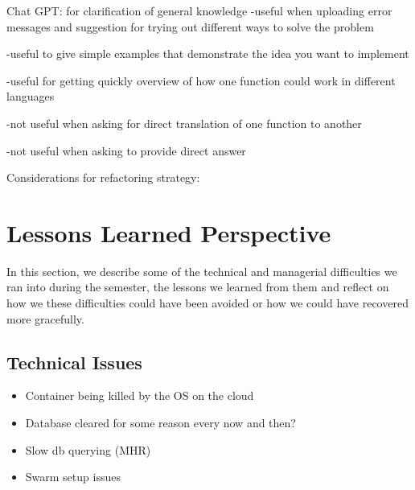 \documentclass{article}
\begin{document}
Chat GPT: for clarification of general knowledge
-useful when uploading error messages and suggestion for trying out different ways to solve the problem

 -useful to give simple examples that demonstrate the idea you want to implement

 -useful for getting quickly overview of how one function could work in different languages

 -not useful when asking for direct translation of one function to another

 -not useful when asking to provide direct answer

 Considerations for refactoring strategy:


\section{Lessons Learned Perspective}
In this section, we describe some of the technical and managerial difficulties we ran into during the semester, the lessons we learned from them and reflect on how we these difficulties could have been avoided or how we could have recovered more gracefully.

\subsection{Technical Issues}

\begin{itemize}
  \item Container being killed by the OS on the cloud
  \item Database cleared for some reason every now and then?
  \item Slow db querying (MHR)
  \item Swarm setup issues
\end{itemize}
\end{document}
